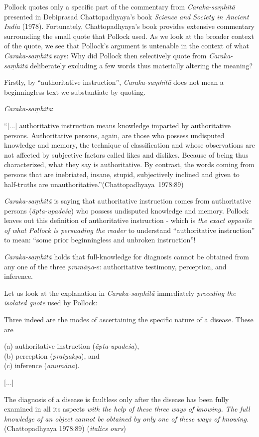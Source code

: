 Pollock quotes only a specific part of the commentary from {\sl Caraka-saṃhitā} presented in Debiprasad Chattopadhyaya's book {\sl Science and Society in Ancient India} (1978).  Fortunately, Chattopadhyaya's book provides extensive commentary surrounding the small quote that Pollock used. As we look at the broader context of the quote, we see that Pollock's argument is untenable in the context of what {\sl Caraka-saṃhitā} says: Why did Pollock then selectively quote from {\sl Caraka-saṃhitā} deliberately excluding a few words thus materially altering the meaning?

Firstly, by ``authoritative instruction'', {{\sl Caraka-saṃhitā}\relax} does not mean a beginningless text we substantiate by quoting.

{\sl Caraka-saṃhitā}:
\begin{myquote}
``[...] authoritative instruction means knowledge imparted by authoritative persons. Authoritative persons, again, are those who possess undisputed knowledge and memory, the technique of classification and whose observations are not affected by subjective factors called likes and dislikes. Because of being thus characterized, what they say is authoritative.  By contrast, the words coming from persons that are inebriated, insane, stupid, subjectively inclined and given to half-truths are unauthoritative.''\hfill \hbox{(Chattopadhyaya 1978:89)}
\end{myquote}

{\sl Caraka-saṃhitā} is saying that authoritative instruction comes from authoritative persons ({\sl āpta-upadeśa}) who possess undisputed knowledge and memory. Pollock leaves out this definition of authoritative instruction - which is {\sl the exact opposite of what Pollock is persuading the reader} to understand ``authoritative instruction'' to mean: ``some prior beginningless and unbroken instruction''!

{\sl Caraka-saṃhitā} holds that full-knowledge for diagnosis cannot be obtained from any one of the three {\sl pramāṇa}-s: authoritative testimony, perception, and inference.

Let us look at the explanation in {\sl Caraka-saṃhitā} immediately {\sl preceding the isolated quote} used by Pollock:
\begin{myquote}
Three indeed are the modes of ascertaining the specific nature of a disease. These are 

(a) authoritative instruction ({\sl āpta-upadeśa}),\\ 
(b) perception ({\sl pratyakṣa}), and\\ 
(c) inference ({\sl anumāna}).

[...]

The diagnosis of a disease is faultless only after the disease has been fully examined in all its aspects {\sl with the help of these three ways of knowing. The full knowledge of an object cannot be obtained by only one of these ways of knowing.}\hfill (Chattopadhyaya 1978:89) ({\sl italics ours})
\end{myquote}


